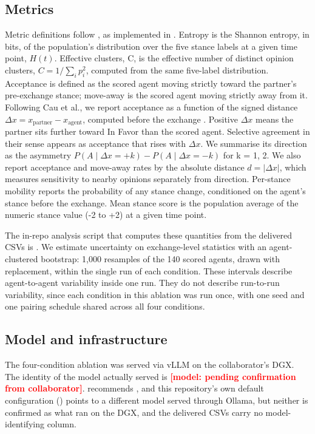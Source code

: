 \documentclass[11pt,a4paper]{article}
\newcommand{\pending}[1]{\textcolor{red}{\textbf{[#1]}}}
\begin{document}
\subsection{Metrics}\label{sec:3.6}

Metric definitions follow \citet{cau2025selective} \citep{cau2025selective}, as implemented in . Entropy is the Shannon entropy, in bits, of the population's distribution over the five stance labels at a given time point, $H(t)$. Effective clusters, C, is the effective number of distinct opinion clusters, $C = 1/\sum_i p_i^2$, computed from the same five-label distribution. Acceptance is defined as the scored agent moving strictly toward the partner's pre-exchange stance; move-away is the scored agent moving strictly away from it. Following Cau et al., we report acceptance as a function of the signed distance $\Delta x = x_{\mathrm{partner}} - x_{\mathrm{agent}}$, computed before the exchange \citep{cau2025selective}. Positive $\Delta x$ means the partner sits further toward In Favor than the scored agent. Selective agreement in their sense appears as acceptance that rises with $\Delta x$. We summarise its direction as the asymmetry $P(A \mid \Delta x = +k) - P(A \mid \Delta x = -k)$ for k = 1, 2. We also report acceptance and move-away rates by the absolute distance $d = |\Delta x|$, which measures sensitivity to nearby opinions separately from direction. Per-stance mobility reports the probability of any stance change, conditioned on the agent's stance before the exchange. Mean stance score is the population average of the numeric stance value (-2 to +2) at a given time point.

The in-repo analysis script that computes these quantities from the delivered CSVs is . We estimate uncertainty on exchange-level statistics with an agent-clustered bootstrap: 1,000 resamples of the 140 scored agents, drawn with replacement, within the single run of each condition. These intervals describe agent-to-agent variability inside one run. They do not describe run-to-run variability, since each condition in this ablation was run once, with one seed and one pairing schedule shared across all four conditions.

\subsection{Model and infrastructure}\label{sec:3.7}

The four-condition ablation was served via vLLM on the collaborator's DGX. The identity of the model actually served is \pending{model: pending confirmation from collaborator}.  recommends , and this repository's own default configuration () points to a different model served through Ollama, but neither is confirmed as what ran on the DGX, and the delivered CSVs carry no model-identifying column.
\end{document}
